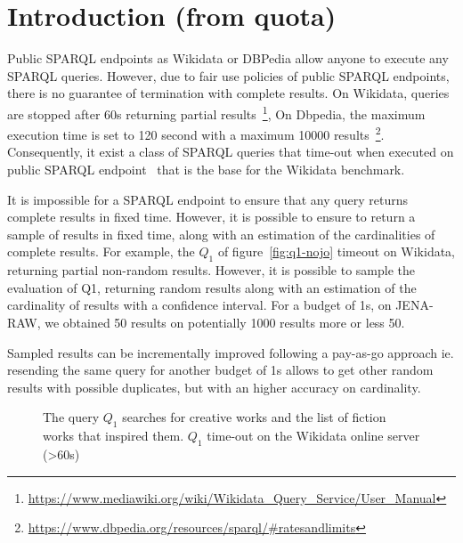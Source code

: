 \section{Introduction (from quota)}

Public SPARQL endpoints as Wikidata or DBPedia allow anyone to execute
any SPARQL queries. However, due to fair use policies of public SPARQL
endpoints, there is no guarantee of termination with complete
results. On Wikidata, queries are stopped after 60s returning partial
results~\footnote{\url{https://www.mediawiki.org/wiki/Wikidata_Query_Service/User_Manual}},
On Dbpedia, the maximum execution time is set to 120 second with a
maximum 10000
results~\footnote{\url{https://www.dbpedia.org/resources/sparql/\#ratesandlimits}}. Consequently,
it exist a class of SPARQL queries that time-out when executed on
public SPARQL endpoint~\cite{DBLP:conf/semweb/MalyshevKGGB18} that is
the base for the Wikidata benchmark\cite{angles2022wdbench}.

It is impossible for a SPARQL endpoint to ensure that any query
returns complete results in fixed time. However, it is possible to
ensure to return a sample of results in fixed time, along with an
estimation of the cardinalities of complete results. For example, the
$Q_1$ of figure~\ref{fig:q1-nojo} timeout on Wikidata, returning
partial non-random results. However, it is possible to sample the
evaluation of Q1, returning random results along with an estimation of
the cardinality of results with a confidence interval. For a budget of
1s, on JENA-RAW, we obtained 50 results on potentially 1000 results
more or less 50.

Sampled results can be incrementally improved following a
pay-as-go approach ie. resending the same
query for another budget of 1s allows to get other random results with
possible duplicates, but with an higher accuracy on cardinality.



\begin{figure}[t]
 \begin{center}
 \end{center}
 \caption{The query $Q_1$ searches for creative works and the list of
  fiction works that inspired them. $Q_1$ time-out on
  the Wikidata online server (>60s)}
 \label{fig:q1}
\end{figure}

